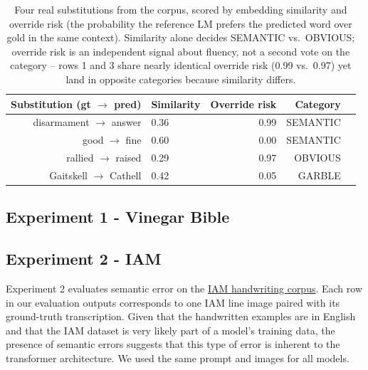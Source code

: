 \documentclass{anthology-ch}         %
\begin{document}
\begin{table}[h]
\centering
\caption{Four real substitutions from the corpus, scored by embedding
similarity and override risk (the probability the reference LM prefers the
predicted word over gold in the same context). Similarity alone decides
SEMANTIC vs.\ OBVIOUS; override risk is an independent signal about
fluency, not a second vote on the category -- rows 1 and 3 share nearly
identical override risk (0.99 vs.\ 0.97) yet land in opposite categories
because similarity differs.}
\label{tab:signal-examples}
\begin{tabular}{rlrrl}
\hline
Substitution (gt $\rightarrow$ pred) & Similarity & Override risk & Category \\
\hline
disarmament $\rightarrow$ answer & 0.36 & 0.99 & SEMANTIC \\
good $\rightarrow$ fine & 0.60 & 0.00 & SEMANTIC \\
rallied $\rightarrow$ raised & 0.29 & 0.97 & OBVIOUS \\
Gaitskell $\rightarrow$ Cathell & 0.42 & 0.05 & GARBLE \\
\hline
\end{tabular}
\end{table}

\subsection{Experiment 1 - Vinegar Bible}

\subsection{Experiment 2 - IAM}
Experiment 2 evaluates semantic error on the \href{https://huggingface.co/datasets/Teklia/IAM-line}{IAM handwriting corpus}. Each row in our evaluation outputs corresponds to one IAM line image paired with its ground-truth transcription. Given that the handwritten examples are in English and that the IAM dataset is very likely part of a model's training data, the presence of semantic errors suggests that this type of error is inherent to the transformer architecture. We used the same prompt and images for all models.  
\end{document}
